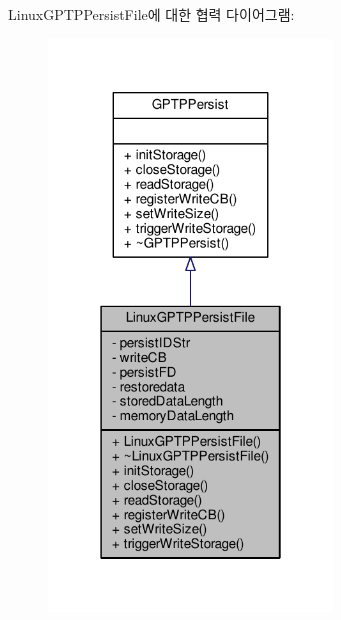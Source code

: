 Linux\+G\+P\+T\+P\+Persist\+File에 대한 협력 다이어그램\+:
\nopagebreak
\begin{figure}[H]
\begin{center}
\leavevmode
\includegraphics[width=214pt]{class_linux_g_p_t_p_persist_file__coll__graph}
\end{center}
\end{figure}
